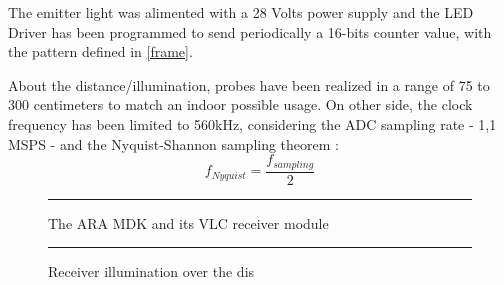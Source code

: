 The emitter light was alimented with a 28 Volts power supply and the LED Driver has been programmed to send periodically a 16-bits counter value, with the pattern defined in \ref{frame}.

About the distance/illumination, probes have been realized in a range of 75 to 300 centimeters to match an indoor possible usage. On other side, the clock frequency has been limited to 560kHz, considering the ADC sampling rate - 1,1 MSPS - and the Nyquist-Shannon sampling theorem : 
\begin{equation}
f_{Nyquist}  = \frac{f_{sampling}}{2}
\label{eq:nyquist}
\end{equation}

\begin{figure}[htbp]
  \centering
    \rule{35em}{0.5pt}
  \caption[The ARA MDK and its VLC receiver module]{The ARA MDK and its VLC receiver module}
  \label{fig:receiver}
\end{figure}

\begin{figure}[htbp]
	\centering
		\rule{35em}{0.5pt}
		\caption{Receiver illumination over the dis}
		\label{fig:led}
	\end{figure}

